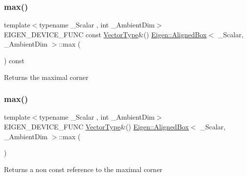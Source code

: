 \subsubsection{\texorpdfstring{max()}{max()}\hspace{0.1cm}{\footnotesize\ttfamily [1/2]}}
{\footnotesize\ttfamily template$<$typename \+\_\+\+Scalar , int \+\_\+\+Ambient\+Dim$>$ \\
E\+I\+G\+E\+N\+\_\+\+D\+E\+V\+I\+C\+E\+\_\+\+F\+U\+NC const \mbox{\hyperlink{class_eigen_1_1_matrix}{Vector\+Type}}\&() \mbox{\hyperlink{class_eigen_1_1_aligned_box}{Eigen\+::\+Aligned\+Box}}$<$ \+\_\+\+Scalar, \+\_\+\+Ambient\+Dim $>$\+::max (\begin{DoxyParamCaption}{ }\end{DoxyParamCaption}) const\hspace{0.3cm}{\ttfamily [inline]}}

\begin{DoxyReturn}{Returns}
the maximal corner 
\end{DoxyReturn}
\mbox{\label{class_eigen_1_1_aligned_box_a1a49b1c085de932a5dd36faf92b8f4de}} 
\subsubsection{\texorpdfstring{max()}{max()}\hspace{0.1cm}{\footnotesize\ttfamily [2/2]}}
{\footnotesize\ttfamily template$<$typename \+\_\+\+Scalar , int \+\_\+\+Ambient\+Dim$>$ \\
E\+I\+G\+E\+N\+\_\+\+D\+E\+V\+I\+C\+E\+\_\+\+F\+U\+NC \mbox{\hyperlink{class_eigen_1_1_matrix}{Vector\+Type}}\&() \mbox{\hyperlink{class_eigen_1_1_aligned_box}{Eigen\+::\+Aligned\+Box}}$<$ \+\_\+\+Scalar, \+\_\+\+Ambient\+Dim $>$\+::max (\begin{DoxyParamCaption}{ }\end{DoxyParamCaption})\hspace{0.3cm}{\ttfamily [inline]}}

\begin{DoxyReturn}{Returns}
a non const reference to the maximal corner 
\end{DoxyReturn}
\mbox{\label{class_eigen_1_1_aligned_box_a8182b7661c4b244285ca0f831363b00a}} 
